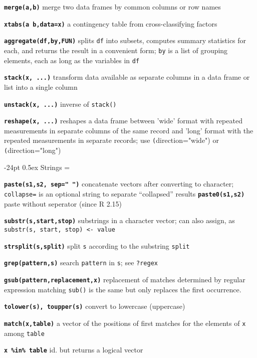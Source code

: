\documentclass[8pt,landscape]{article}
\makeatletter
\renewcommand\section{\@startsection{section}{1}{0mm}%
                                     {-24pt}%
                                     {0.5ex}%
                                {\color{blue}\normalfont\large\bfseries}}
\newcommand{\code}{\texttt}
\newcommand{\bcode}[1]{\texttt{\textbf{#1}}}
\makeatother
\begin{document}
\begin{multicols*}{3}
\bcode{merge(a,b)} merge two data frames by common columns or row names

\bcode{xtabs(a~b,data=x)} a contingency table from cross-classifying factors

\bcode{aggregate(df,by,FUN)} splits \code{df} into subsets, computes summary statistics for
     each, and returns the result in a convenient form; \code{by} is a
     list of grouping elements, each as long as the variables in \code{df}

\bcode{stack(x, ...)} transform data available as
     separate columns in a data frame or list into a single column

\bcode{unstack(x, ...)} inverse of \code{stack()}

\bcode{reshape(x, ...)} reshapes a data frame between 'wide' format with
     repeated measurements in separate columns of the same record and
     'long' format with the repeated measurements in separate records;
     use \code(direction="wide") or \code(direction="long")





\section{Strings}
\everypar={\hangindent=9mm}

\bcode{paste(s1,s2, sep=" ")} concatenate vectors after converting to character; 
\code{collapse=} is an optional string to separate ``collapsed'' results
\bcode{paste0(s1,s2)} paste without seperator (since R 2.15)

\bcode{substr(s,start,stop)} substrings in a character vector; can also assign, as \code{substr(s, start, stop) <- value}

\bcode{strsplit(s,split)} split \code{s} according to the substring \code{split}

\bcode{grep(pattern,s)} search \code{pattern} in \code{s}; see \code{?regex}

\bcode{gsub(pattern,replacement,x)} replacement of matches determined by
regular expression matching \code{sub()} is the same but only
replaces the first occurrence. 

\bcode{tolower(s), toupper(s)} convert to lowercase (uppercase)

\bcode{match(x,table)} a vector of the positions of first matches for the elements of \code{x} among \code{table}

\bcode{x \%in\% table} id. but returns a logical vector 


\end{multicols*}
\end{document}
